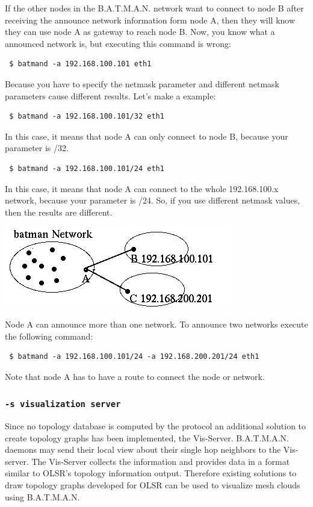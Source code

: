 \documentclass[
	12pt,
	a4paper,
	twoside,
	english,
	headsepline,
	footnosepline,
	automark,
	normalheadings,
	openany,
	cleardoubleplain,
	abstracton,
	idxtotoc,
	liststotoc,
	bibtotoc,
 	BCOR8mm,
]{scrartcl}
\newcommand{\subsubsectionttt}[1]{\subsubsection{\texttt{#1}}}
\begin{document}
If the other nodes in the B.A.T.M.A.N. network want to connect to node B after receiving the announce network information form node A, then they will know they can use node A as gateway to reach node B. Now, you know what a announced network is, but executing this command is wrong:
\begin{verbatim}
 $ batmand -a 192.168.100.101 eth1
\end{verbatim}

Because you have to specify the netmask parameter and different netmask parameters cause different results. Let's make a example:
\begin{verbatim}
 $ batmand -a 192.168.100.101/32 eth1
\end{verbatim}
In this case, it means that node A can only connect to node B, because your parameter is /32.

\begin{verbatim}
 $ batmand -a 192.168.100.101/24 eth1
\end{verbatim}
In this case, it means that node A can connect to the whole 192.168.100.x network, because your parameter is /24. So, if you use different netmask values, then the results are different.

\begin{center}
\includegraphics[scale=0.8]{multiple_announces}
\end{center}

Node A can announce more than one network. To announce two networks execute the following command:
\begin{verbatim}
 $ batmand -a 192.168.100.101/24 -a 192.168.200.201/24 eth1
\end{verbatim}
Note that node A has to have a route to connect the node or network.

\subsubsectionttt{-s visualization server}
Since no topology database is computed by the protocol an additional solution to create topology graphs has been implemented, the Vis-Server. B.A.T.M.A.N. daemons may send their local view about their single hop neighbors to the Vis-server. The Vis-Server collects the information and provides data in a format similar to OLSR's topology information output. Therefore existing solutions to draw topology graphs developed for OLSR can be used to visualize mesh clouds using B.A.T.M.A.N.
\end{document}
